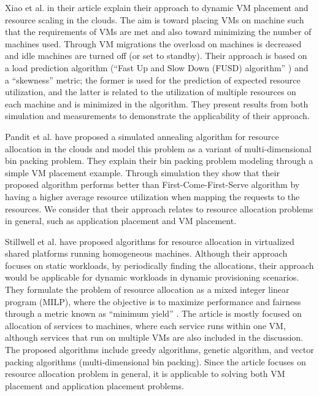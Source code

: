 \documentclass[10pt,journal,cspaper,compsoc]{IEEEtran}
\begin{document}
Xiao et al. \cite{2013_Xiao_DynResAllocationVM} in their article explain their approach to dynamic VM placement and resource scaling in the clouds. The aim is toward placing VMs on machine such that the requirements of VMs are met and also toward minimizing the number of machines used. Through VM migrations the overload on machines is decreased and idle machines are turned off (or set to standby). Their approach is based on a load prediction algorithm (``Fast Up and Slow Down (FUSD) algorithm'' \cite{2013_Xiao_DynResAllocationVM}) and a ``skewness'' \cite{2013_Xiao_DynResAllocationVM} metric; the former is used for the prediction of expected resource utilization, and the latter is related to the utilization of multiple resources on each machine and is minimized in the algorithm. They present results from both simulation and measurements to demonstrate the applicability of their approach.

Pandit et al. \cite{2014_ResourceAllocSimAnnealing} have proposed a simulated annealing algorithm for resource allocation in the clouds and model this problem as a variant of multi-dimensional bin packing problem. They explain their bin packing problem modeling through a simple VM placement example. Through simulation they show that their proposed algorithm performs better than First-Come-First-Serve algorithm by having a higher average resource utilization when mapping the requests to the resources. We consider that their approach relates to resource allocation problems in general, such as application placement and VM placement.

Stillwell et al. \cite{2010_ResourceAllocationAlgorithms} have proposed algorithms for resource allocation in virtualized shared platforms running homogeneous machines. Although their approach focuses on static workloads, by periodically finding the allocations, their approach would be applicable for dynamic workloads in dynamic provisioning scenarios. They formulate the problem of resource allocation as a mixed integer linear program (MILP), where the objective is to maximize performance and fairness through a metric known as ``minimum yield'' \cite{2010_ResourceAllocationAlgorithms}. The article is mostly focused on allocation of services to machines, where each service runs within one VM, although services that run on multiple VMs are also included in the discussion. The proposed algorithms include greedy algorithms, genetic algorithm, and vector packing algorithms (multi-dimensional bin packing). Since the article focuses on resource allocation problem in general, it is applicable to solving both VM placement and application placement problems.
\end{document}
